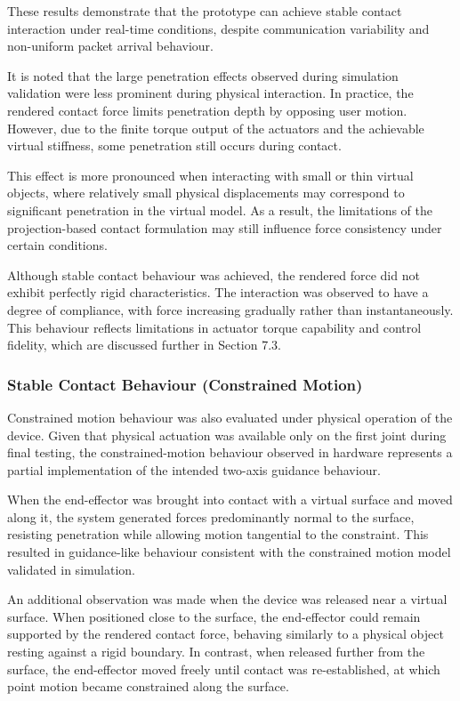 These results demonstrate that the prototype can achieve stable contact interaction under real-time conditions, despite communication variability and non-uniform packet arrival behaviour.

It is noted that the large penetration effects observed during simulation validation were less prominent during physical interaction. In practice, the rendered contact force limits penetration depth by opposing user motion. However, due to the finite torque output of the actuators and the achievable virtual stiffness, some penetration still occurs during contact.

This effect is more pronounced when interacting with small or thin virtual objects, where relatively small physical displacements may correspond to significant penetration in the virtual model. As a result, the limitations of the projection-based contact formulation may still influence force consistency under certain conditions.

Although stable contact behaviour was achieved, the rendered force did not exhibit perfectly rigid characteristics. The interaction was observed to have a degree of compliance, with force increasing gradually rather than instantaneously. This behaviour reflects limitations in actuator torque capability and control fidelity, which are discussed further in Section 7.3.

\subsubsection{Stable Contact Behaviour (Constrained Motion)}

Constrained motion behaviour was also evaluated under physical operation of the device. Given that physical actuation was available only on the first joint during final testing, the constrained-motion behaviour observed in hardware represents a partial implementation of the intended two-axis guidance behaviour.

When the end-effector was brought into contact with a virtual surface and moved along it, the system generated forces predominantly normal to the surface, resisting penetration while allowing motion tangential to the constraint. This resulted in guidance-like behaviour consistent with the constrained motion model validated in simulation.

An additional observation was made when the device was released near a virtual surface. When positioned close to the surface, the end-effector could remain supported by the rendered contact force, behaving similarly to a physical object resting against a rigid boundary. In contrast, when released further from the surface, the end-effector moved freely until contact was re-established, at which point motion became constrained along the surface.

